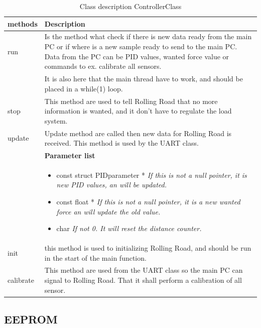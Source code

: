 \begin{table}[H]
	\centering
	\begin{tabular}{|p{5 cm}|p{10 cm}|}
		\hline
		\textbf{methods} & \textbf{Description} \\ \hline
		
		run
		& Is the method what check if there is new data ready from the main PC or if where is a new sample ready to send to the main PC. Data from the PC can be PID values, wanted force value or commands to ex. calibrate all sensors. 
		\\ & It is also here that the main thread have to work, and should be placed in a while(1) loop. \\ 
		\hline
		
		stop
		& This method are used to tell Rolling Road that no more information is wanted, and it don't have to regulate the load system. 
		\\ \hline
		
		update
		& Update method are called then new data for Rolling Road is received. This method is used by the UART class.
		\\ & \textbf{Parameter list}
		\\ & \begin{itemize}
			\item {\large const struct PIDparameter *}
			\subitem \textit{If this is not a null pointer, it is new PID values, an will be updated.}
			\item {\large const float *}
			\subitem \textit{If this is not a null pointer, it is a new wanted force an will update the old value.}
			\item {\large char}
			\subitem \textit{If not 0. It will reset the distance counter.}
		\end{itemize}
		\\ \hline
		
		init
		& this method is used to initializing Rolling Road, and should be run in the start of the main function.  
		\\ \hline
		
		calibrate
		& This method are used from the UART class so the main PC can signal to Rolling Road. That it shall perform a calibration of all sensor.
		\\ \hline
	\end{tabular}
	\caption{Class description ControllerClass}
	\label{table:Class_description_ControllerClass_RR_PSoC}
\end{table}

\subsection{EEPROM}

